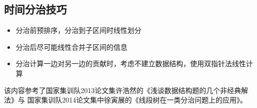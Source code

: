 \subsection{时间分治技巧}
\begin{itemize}
    \item 分治前预排序，分治到子区间时线性划分
    \item 分治后尽可能线性合并子区间的信息
    \item 分治计算一边对另一边的贡献时，考虑不建立数据结构，使用双指针法线性计算
\end{itemize}

该内容参考了国家集训队2013论文集许浩然的《浅谈数据结构题的几个非经典解法》与
国家集训队2014论文集中徐寅展的《线段树在一类分治问题上的应用》。
